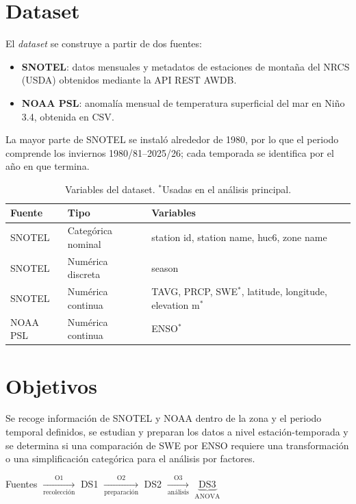 \documentclass{article}
\begin{document}
\section{Dataset}
El \textit{dataset} se construye a partir de dos fuentes:
\begin{itemize}
\item \textbf{SNOTEL}: datos mensuales y metadatos de estaciones de montaña del NRCS (USDA) obtenidos mediante la API REST AWDB\cite{awdb}.
\item \textbf{NOAA PSL}: anomalía mensual de temperatura superficial del mar en Niño 3.4, obtenida en CSV\cite{psl_csv}.
\end{itemize}
La mayor parte de SNOTEL se instaló alrededor de 1980\cite{mote2008}, por lo que el periodo comprende los inviernos 1980/81--2025/26; cada temporada se identifica por el año en que termina.
\begin{table}[ht]
\centering
\small
\begin{tabular}{llp{6cm}}
\toprule
Fuente & Tipo & Variables \\
\midrule
SNOTEL & Categórica nominal & station id, station name, huc6, zone name \\
SNOTEL & Numérica discreta & season \\
SNOTEL & Numérica continua & TAVG, PRCP, SWE$^{*}$, latitude, longitude, elevation m$^{*}$ \\
NOAA PSL & Numérica continua & ENSO$^{*}$ \\
\bottomrule
\end{tabular}
\caption{Variables del dataset. $^{*}$Usadas en el análisis principal.}
\label{tab:dataset}
\end{table}

\newpage
\section{Objetivos}
Se recoge información de SNOTEL y NOAA dentro de la zona y el periodo temporal definidos, se estudian y preparan los datos a nivel estación-temporada y se determina si una comparación de SWE por ENSO requiere una transformación o una simplificación categórica para el análisis por factores.
\begin{center}
\small Fuentes $\xrightarrow[\text{recolección}]{\text{O1}}$ DS1 $\xrightarrow[\text{preparación}]{\text{O2}}$ DS2 $\xrightarrow[\text{análisis}]{\text{O3}}$ $\underbrace{\mathrm{DS3}}_{\text{ANOVA}}$
\end{center}
\end{document}
